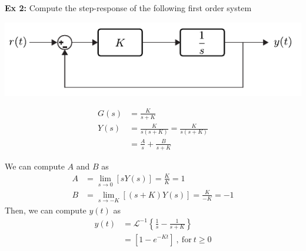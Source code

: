 \documentclass[twoside]{article}
\begin{document}
     \vspace{12pt}
     
     \textbf{Ex 2:} Compute the step-response of the following first order system
     
         \begin{minipage}[h]{0.7\linewidth}
    \begin{center}
      \includegraphics[width=1\textwidth]{firstex}
    \end{center}
  \end{minipage}
    \begin{minipage}[h]{0.3\linewidth}
    \begin{center}
      \begin{align*}
	G(s) &= \frac{K}{s+K} \
	\\
	Y(s) &= \frac{K}{s (s+K)} = \frac{K}{s (s+K)}
	\\
	&= \frac{A}{s} + \frac{B}{s+K}
      \end{align*}
    \end{center}
  \end{minipage}
  
  We can compute $A$ and $B$ as
  \begin{align*}
  	A &= \lim_{s \to 0} \left[  s Y(s) \right] = \frac{K}{K} = 1
	\\
	B &= \lim_{s \to -K} \left[  (s+K) Y(s) \right] = \frac{K}{-K} = -1
   \end{align*}
%
Then, we can compute $y(t)$ as
%
  \begin{align*}
y(t) &= \mathcal{L}^{-1} \left\lbrace \frac{1}{s} - \frac{1}{s+K} \right\rbrace  
\\
&= \left[ 1 - e^{-K t} \right] \ , \ \mathrm{for} \ t \geq 0
\end{align*}
\end{document}
